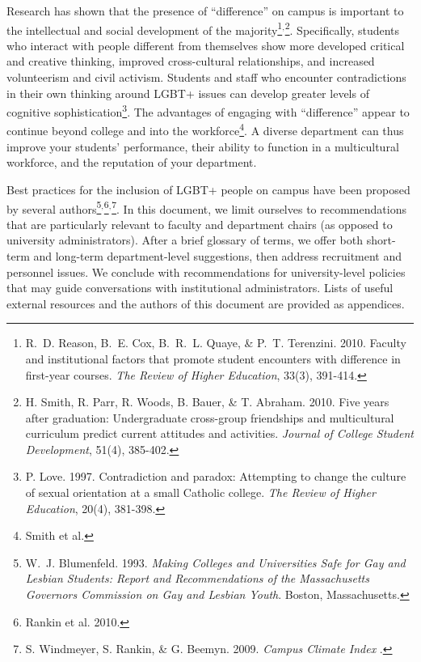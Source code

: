 \begin{titlepage}
Research has shown that the presence of ``difference'' on campus is important to the intellectual and social development of the majority\footnote{R.~D. Reason, B.~E. Cox, B.~R.~L. Quaye, \& P.~T. Terenzini. 2010. Faculty and institutional factors that promote student encounters with difference in first-year courses. {\em The Review of Higher Education}, 33(3), 391-414.}$^,$\footnote{H. Smith, R. Parr, R. Woods, B. Bauer, \& T. Abraham. 2010. Five years after graduation: Undergraduate cross-group friendships and multicultural curriculum predict current attitudes and activities. {\em Journal of College Student Development}, 51(4), 385-402.}. Specifically, students who interact with people different from themselves show more developed critical and creative thinking, improved cross-cultural relationships, and increased volunteerism and civil activism. Students and staff who encounter contradictions in their own thinking around LGBT+ issues can develop greater levels of cognitive sophistication\footnote{P. Love. 1997. Contradiction and paradox: Attempting to change the culture of sexual orientation at a small Catholic college. {\em The Review of Higher Education}, 20(4), 381-398.}. The advantages of engaging with ``difference'' appear to continue beyond college and into the workforce\footnote{Smith et al.}. A diverse department can thus improve your students' performance, their ability to function in a multicultural workforce, and the reputation of your department. \vspace*{\baselineskip}

Best practices for the inclusion of LGBT+ people on campus have been proposed by several authors\footnote{W.~J. Blumenfeld. 1993. \emph{Making Colleges and Universities Safe for Gay and Lesbian Students: Report and Recommendations of the Massachusetts Governors Commission on Gay and Lesbian Youth}. Boston, Massachusetts.}$^,$\footnote{Rankin et al. 2010.}$^,$\footnote{{S. Windmeyer, S. Rankin, \& G. Beemyn. 2009.} {\emph{Campus Climate Index}} .}. In this document, we limit ourselves to recommendations that are particularly relevant to faculty and department chairs (as opposed to university administrators). After a brief glossary of terms, we offer both short-term and long-term department-level suggestions, then address recruitment and personnel issues.  We conclude with recommendations for university-level policies that may guide conversations with institutional administrators. Lists of useful external resources and the authors of this document are provided as appendices.

\end{titlepage}